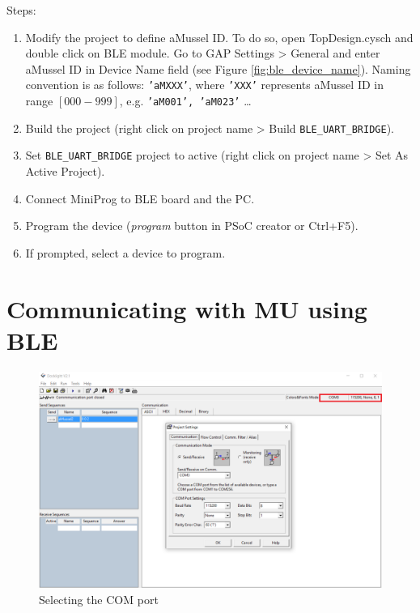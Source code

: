 Steps:
\begin{enumerate}
	\item Modify the project to define aMussel ID. To do so, open TopDesign.cysch and double click on BLE module. Go to GAP Settings > General and enter aMussel ID in Device Name field (see Figure \ref{fig:ble_device_name}). Naming convention is as follows: \texttt{'aMXXX'}, where \texttt{'XXX'} represents aMussel ID in range $[000-999]$, e.g. \texttt{'aM001', 'aM023'} \ldots
	\item Build the project (right click on project name > Build \texttt{BLE\_UART\_BRIDGE}).
	\item Set \texttt{BLE\_UART\_BRIDGE} project to active (right click on project name > Set As Active Project).
	\item Connect MiniProg to BLE board and the PC.
	\item Program the device (\textit{program} button in PSoC creator or Ctrl+F5).
	\item If prompted, select a device to program.
\end{enumerate}

\section{Communicating with MU using BLE}

\begin{figure}[htb]
    \centering
	  \includegraphics[width=\linewidth]{figures/Docklight_COM.PNG}
	\caption{Selecting the COM port}
	\label{fig:docklight_com}
\end{figure}

